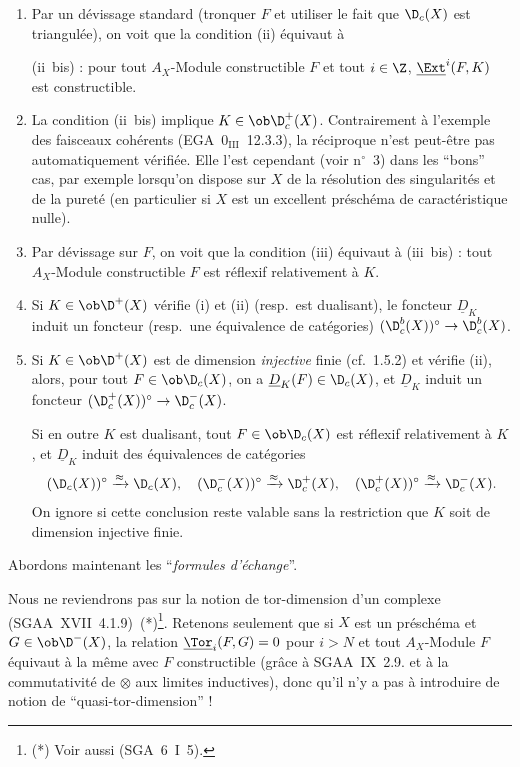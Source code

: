 \begin{remark}
\begin{enumerate}
\item[a)] Par un dévissage standard (tronquer $F$ et utiliser le fait que $\D_c(X)$ est triangulée), on voit que la condition (ii) équivaut à

(ii~bis) : pour tout $A_X$-Module constructible $F$ et tout $i \in \Z$, $\underline{\Ext}^i(F,K)$ est constructible.

\item[b)] La condition (ii~bis) implique $K \in \ob \D_c^{+}(X)$. Contrairement à l'exemple des faisceaux cohérents (EGA~$0_{\mathrm{III}}$~12.3.3), la réciproque n'est peut-être pas automatiquement vérifiée. Elle l'est cependant (voir n${}^{\circ}$~3) dans les ``bons'' cas, par exemple lorsqu'on dispose sur $X$ de la résolution des singularités et de la pureté (en particulier si $X$ est un excellent préschéma de caractéristique nulle).

\item[c)] Par dévissage sur $F$, on voit que la condition (iii) équivaut à (iii~bis) : tout $A_X$-Module constructible $F$ est réflexif relativement à $K$.

\item[d)] Si $K \in \ob \D^{+}(X)$ vérifie (i) et (ii) (resp.~est dualisant), le foncteur $\underline{D}_K$ induit un foncteur (resp.~une équivalence de catégories) $(\D_c^{b}(X))^{\circ} \to \D_c^{b}(X)$.

\item[e)] Si $K \in \ob \D^{+}(X)$ est de dimension \emph{injective} finie (cf.~1.5.2) et vérifie (ii), alors, pour tout $F \in \ob \D_c(X)$, on a $\underline{D}_K(F) \in \D_c(X)$, et $\underline{D}_K$ induit un foncteur $(\D_c^{+}(X))^{\circ} \to \D_c^{-}(X)$.

Si en outre $K$ est dualisant, tout $F \in \ob \D_c(X)$ est réflexif relativement à $K$, et $\underline{D}_K$ induit des équivalences de catégories
\[
(\D_c(X))^{\circ} \xrightarrow{\approx} \D_c(X), \quad (\D_c^{-}(X))^{\circ} \xrightarrow{\approx} \D_c^{+}(X), \quad (\D_c^{+}(X))^{\circ} \xrightarrow{\approx} \D_c^{-}(X).
\]
On ignore si cette conclusion reste valable sans la restriction que $K$ soit de dimension injective finie.
\end{enumerate}
\end{remark}

Abordons maintenant les ``\emph{formules d'échange}''.

Nous ne reviendrons pas sur la notion de tor-dimension d'un complexe (SGAA~XVII~4.1.9)~(*)\footnote{(*) Voir aussi (SGA~6~I~5).}. Retenons seulement que si $X$ est un préschéma et $G \in \ob \D^{-}(X)$, la relation $\underline{\Tor}_i(F,G) = 0$ pour $i > N$ et tout $A_X$-Module $F$ équivaut à la même avec $F$ constructible (grâce à SGAA~IX~2.9. et à la commutativité de $\otimes$ aux limites inductives), donc qu'il n'y a pas à introduire de notion de ``quasi-tor-dimension'' !

